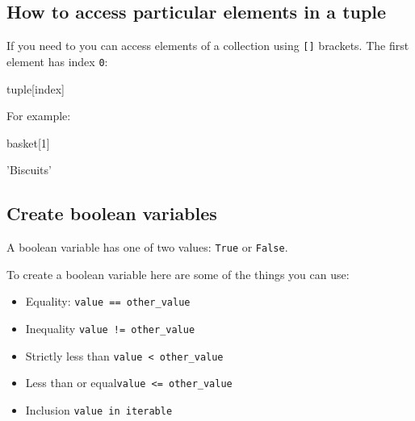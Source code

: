 \subsection{How to access particular elements in a tuple}
\label{sec:how-to-access-particular-elements-in-a-tuple}

If you need to you can access elements of a collection using \texttt{[]} brackets. The
first element has index \texttt{0}:

\begin{pyin}
tuple[index]
\end{pyin}


For example:




\begin{pyin}
basket[1]
\end{pyin}





\begin{raw}
'Biscuits'
\end{raw}





\subsection{Create boolean variables}
\label{sec:create_boolean_variables}

A boolean variable has one of two values: \texttt{True} or \texttt{False}.


To create a boolean variable here are some of the things you can use:
\begin{itemize}
\item 

Equality: \texttt{value == other\_value}

\item 

Inequality \texttt{value != other\_value}

\item 

Strictly less than \texttt{value < other\_value}

\item 

Less than or equal\texttt{value <= other\_value}

\item 

Inclusion \texttt{value in iterable}

\end{itemize}


